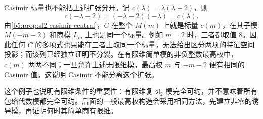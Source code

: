\ProseParagraphBreak
Casimir 标量也不能把上述扩张分开。记 \(c(\lambda)=\lambda(\lambda+2)\)，则
\[
	c(-\lambda-2)=(-\lambda-2)(-\lambda)=c(\lambda).
\]
由\cref{b5:prop:sl2-casimir-central}，\(C\) 在整个 \(M(m)\) 上就是标量 \(c(m)\)，在其子模 \(M(-m-2)\) 和商模 \(L_m\) 上也是同一个标量。例如 \(m=2\) 时，三者都取值 \(8\)。因此任何 \(C\) 的多项式也只能在三者上取同一个标量，无法给出区分两项的特征空间投影；而该列已经独立证明不分裂。在有限维简单模的非负整数最高权中，\(c(m)\) 两两不同；一旦允许上述无限维模，最高权 \(m\) 与 \(-m-2\) 便有相同的 Casimir 值。这说明 Casimir 不能分离这个扩张。

\ProseParagraphBreak
这个例子也说明有限维条件的重要性：有限维复 \(\mathfrak{sl}_2\) 模完全可约，并不意味着所有包络代数模都完全可约。后面的一般最高权构造会采用相同方法，先建立非零的诱导模，再证明何时其简单商有限维。
